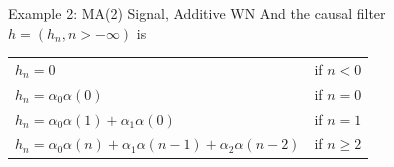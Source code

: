 \documentclass{beamer}  %
\begin{document}

\begin{frame}{Example 2: MA(2) Signal, Additive WN}
	And the causal filter $h = (h_n, n > -\infty)$ is 
	\begin{center}
		\bigskip
		\begin{tabular}{l @{\qquad} r}
			$ h_n = 0 $ & if $n<0$ \\
			$ h_n = \alpha_0\alpha(0) $ & if $n=0$ \\
			$ h_n = \alpha_0\alpha(1) + \alpha_1\alpha(0) $ & if $n=1$ \\
			$ h_n = \alpha_0\alpha(n)+\alpha_1\alpha(n-1)+\alpha_2\alpha(n-2) $ & if $n\ge2$
		\end{tabular}
	\end{center}
\end{frame}	

\end{document}
